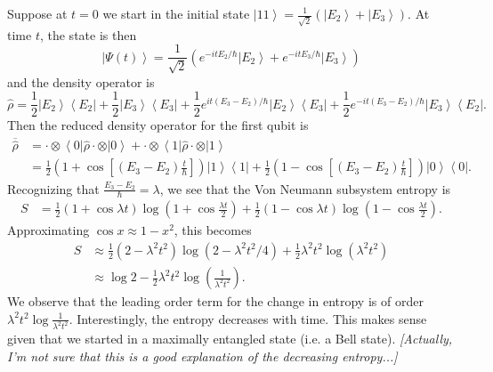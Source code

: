 \documentclass[11pt]{article}
\newcommand{\bra}[1]{\left\langle#1\right|}
\newcommand{\ket}[1]{\left|#1\right\rangle}
\newcommand{\op}[1]{\hat{#1}}
\theoremstyle{theorem}
\theoremstyle{remark}
\theoremstyle{step}
\theoremstyle{gap}
\begin{document}
Suppose at \(t=0\) we start in the initial state \(\ket{11} = \frac{1}{\sqrt{2}}\left(\ket{E_2}+\ket{E_3}\right)\). At time \(t\), the state is then
\[
\ket{\Psi(t)} = \frac{1}{\sqrt{2}}\left(e^{-itE_2/\hbar}\ket{E_2} + e^{-itE_3/\hbar} \ket{E_3}\right)
\]
and the density operator is
\[
\op{\rho} = \frac{1}{2}\ket{E_2}\bra{E_2} + \frac{1}{2}\ket{E_3}\bra{E_3} + \frac{1}{2} e^{it\left(E_3-E_2\right)/\hbar} \ket{E_2}\bra{E_3} + \frac{1}{2} e^{-it\left(E_3 - E_2\right)/\hbar} \ket{E_3}\bra{E_2}.
\]
Then the reduced density operator for the first qubit is
\begin{align*}
\overline{\op{\rho}} &= \cdot\otimes\bra{0} \op{\rho} \cdot\otimes\ket{0} + \cdot\otimes\bra{1} \op{\rho} \cdot\otimes\ket{1} \\
&= \frac{1}{2}\left(1 + \cos \left[\left(E_3-E_2\right)\frac{t}{\hbar}\right] \right)\ket{1}\bra{1} + \frac{1}{2}\left(1 -\cos \left[\left(E_3-E_2\right)\frac{t}{\hbar}\right] \right)\ket{0}\bra{0}.
\end{align*}
Recognizing that \(\frac{E_3-E_2}{\hbar} = \lambda\), we see that the Von Neumann subsystem entropy is
\begin{align*}
S &= \frac{1}{2}\left(1 + \cos \lambda t \right)\log \left(1+\cos \frac{\lambda t}{2}\right)
+ \frac{1}{2}\left(1 - \cos \lambda t \right)\log \left(1-\cos \frac{\lambda t}{2}\right).
\end{align*}
Approximating \(\cos x \approx 1-x^2\), this becomes
\begin{align*}
S &\approx \frac{1}{2}\left(2-\lambda^2 t^2\right) \log \left(2-\lambda^2 t^2/4\right) + \frac{1}{2}\lambda^2 t^2 \log \left(\lambda^2 t^2\right) \\
&\approx \log 2 - \frac{1}{2}\lambda^2 t^2 \log \left(\frac{1}{\lambda^2 t^2}\right).
\end{align*}
We observe that the leading order term for the change in entropy is of order \(\lambda^2t^2 \log \frac{1}{\lambda^2 t^2}\). Interestingly, the entropy decreases with time. This makes sense given that we started in a maximally entangled state (i.e. a Bell state). \emph{[Actually, I'm not sure that this is a good explanation of the decreasing entropy...]}
\end{document}

